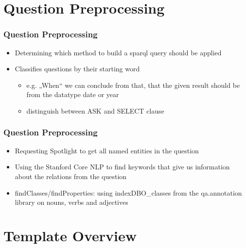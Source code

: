 \documentclass{beamer}
\begin{document}
\section{Question Preprocessing}

\begin{frame}
\frametitle{Question Preprocessing}
\begin{itemize}
	\item Determining which method to build a sparql query should be applied
	\item Classifies questions by their starting word
	\begin{itemize}
		\item e.g. „When“ we can conclude from that, that the given result should be from the datatype date or year
		\item distinguish between ASK and SELECT clause
	\end{itemize}
\end{itemize}
\end{frame}

\begin{frame}
\frametitle{Question Preprocessing}
\begin{itemize}
	\item Requesting Spotlight to get all named entities in the question
	\item Using the Stanford Core NLP to find keywords that give us information about the relations from the question 
	\item findClasses/findProperties: using indexDBO\_classes from the qa.annotation library on nouns, verbs and adjectives
\end{itemize}
\end{frame}

\section{Template Overview}
\end{document}
